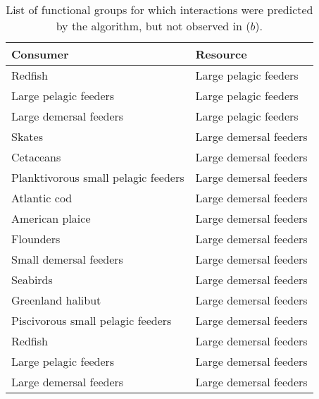\begin{table}[h!]
    \centering
    \begin{tabular}{|l|l|}
    \hline
    Consumer               & Resource \\
    \hline    \hline
    Redfish                             & Large pelagic feeders \\
    Large pelagic feeders               & Large pelagic feeders \\
    Large demersal feeders              & Large pelagic feeders \\
    Skates                              & Large demersal feeders    \\
    Cetaceans                           & Large demersal feeders    \\
    Planktivorous small pelagic feeders & Large demersal feeders    \\
    Atlantic cod                        & Large demersal feeders    \\
    American plaice                     & Large demersal feeders    \\
    Flounders                           & Large demersal feeders    \\
    Small demersal feeders              & Large demersal feeders    \\
    Seabirds                            & Large demersal feeders    \\
    Greenland halibut                   & Large demersal feeders    \\
    Piscivorous small pelagic feeders   & Large demersal feeders    \\
    Redfish                             & Large demersal feeders    \\
    Large pelagic feeders               & Large demersal feeders    \\
    Large demersal feeders              & Large demersal feeders    \\
    \hline
\end{tabular}
    \caption{List of functional groups for which interactions were predicted by the algorithm, but not observed in \citet{savenkoff2004} ($b$).}
\end{table}

